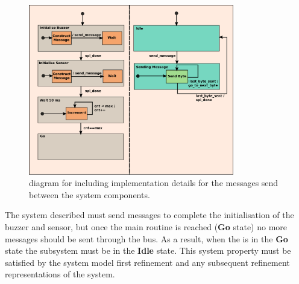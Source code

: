 \begin{figure}[!htbp]
  \begin{centering}
  \includegraphics[width=0.8\textwidth]{figures/ASIC&SPI_2}
  \caption{\Statechart diagram for \IDS including implementation details for the messages send between the system components.}
  \label{fig:ASIC_SPI_2}
  \end{centering}
\end{figure} 

The system described must send messages to complete the initialisation of the buzzer and sensor, but once the main routine is reached (\textbf{Go} state) no more messages should be sent through the \SPI bus. As a result, when the \ASIC is in the \textbf{Go} state the \SPI subsystem must be in the \textbf{Idle} state. This system property must be satisfied by the system model first refinement and any subsequent refinement representations of the system.




